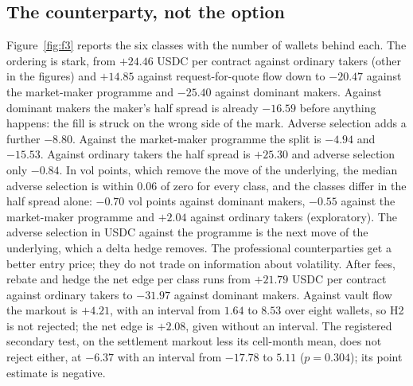 \documentclass[a4paper,fleqn]{cas-dc}
\begin{document}
\subsection{The counterparty, not the option}
Figure~\ref{fig:f3} reports the six classes with the number of wallets behind each. The ordering is stark,
from $+24.46$ USDC per contract against ordinary takers (other in the figures) and $+14.85$ against request-for-quote flow down to
$-20.47$ against the market-maker programme and $-25.40$ against dominant makers. Against dominant makers the
maker's half spread is already $-16.59$ before anything happens: the fill is struck on the wrong side of the
mark. Adverse selection adds a further $-8.80$. Against the market-maker programme the split is
$-4.94$ and $-15.53$. Against ordinary takers the half spread is $+25.30$ and adverse selection only
$-0.84$. In vol points, which remove the move of the
underlying, the median adverse selection is within $0.06$ of zero for every class, and the classes differ in
the half spread alone: $-0.70$ vol points against dominant makers, $-0.55$ against the market-maker programme
and $+2.04$ against ordinary takers (exploratory). The adverse selection in USDC against the programme is the next move of
the underlying, which a delta hedge removes. The professional counterparties get a better entry price; they
do not trade on information about volatility. After fees, rebate and hedge the net edge per class runs from $+21.79$ USDC per contract against
ordinary takers to $-31.97$ against dominant makers. Against vault flow the markout is $+4.21$, with an
interval from $1.64$ to $8.53$ over eight wallets, so H2 is not rejected; the net edge is $+2.08$, given
without an interval. The registered secondary test, on the settlement markout less its cell-month mean, does
not reject either, at $-6.37$ with an interval from $-17.78$ to $5.11$ ($p = 0.304$); its point estimate is
negative.
\end{document}
